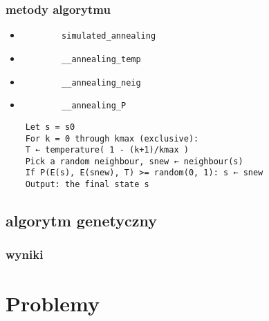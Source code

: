 \documentclass[12pt,a4paper]{article}
\begin{document}
\subsubsection{metody algorytmu}
\begin{itemize}
	\item \begin{verbatim}
		simulated_annealing	
	\end{verbatim}
	
	\item \begin{verbatim}
		__annealing_temp
	\end{verbatim}

	\item \begin{verbatim}
		__annealing_neig
	\end{verbatim}

	\item \begin{verbatim}
		__annealing_P
	\end{verbatim}

\end{itemize}

\begin{verbatim}
	Let s = s0
	For k = 0 through kmax (exclusive):
	T ← temperature( 1 - (k+1)/kmax )
	Pick a random neighbour, snew ← neighbour(s)
	If P(E(s), E(snew), T) >= random(0, 1): s ← snew
	Output: the final state s
\end{verbatim}


\subsection{algorytm genetyczny}


\subsubsection{wyniki}





\section{Problemy}
	
\end{document}
